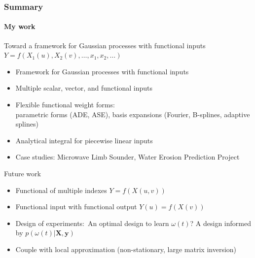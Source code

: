 \documentclass{snedecorbeamer}
\begin{document}
\begin{frame}
  \frametitle{Summary}
  \framesubtitle{My work}

  Toward a framework for Gaussian processes with functional inputs
  $Y = f(X_1(u), X_2(v), \dots, x_1, x_2, \dots)$
  \begin{itemize}
    \footnotesize
  \item Framework for Gaussian processes with functional inputs
  \item Multiple scalar, vector, and functional inputs
  \item Flexible functional weight forms: \\
    parametric forms (ADE, ASE),
    basis expansions (Fourier, B-splines, adaptive splines)
  \item \hyperlink{frm:validation}{}
    Analytical integral for piecewise linear inputs
  \item Case studies: Microwave Limb Sounder, Water Erosion Prediction Project
  \end{itemize}
  \vspace{3ex}

  Future work
  \begin{itemize}
    \footnotesize
  \item Functional of multiple indexes $Y = f(X(u, v))$
  \item Functional input with functional output $Y(u) = f(X(v))$
  \item Design of experiments:~An optimal design to learn $\omega(t)$?
    A design informed by $p(\omega(t) | \mathbf{X}, \mathbf{y})$
  \item Couple with local approximation (non-stationary, large matrix inversion)
  \end{itemize}
\end{frame}
\end{document}
